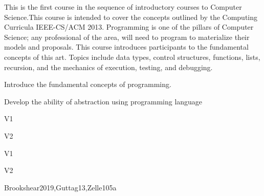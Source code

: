 \begin{syllabus}


\begin{justification}
This is the first course in the sequence of introductory courses to Computer Science.This course is intended to cover the concepts outlined by the
Computing Curricula IEEE-CS/ACM 2013.
Programming is one of the pillars of Computer Science; any professional of the area, will need to program to materialize their models and proposals.
This course introduces participants to the fundamental concepts of this art.
Topics include data types, control structures, functions, lists, recursion, and the mechanics of execution, testing, and debugging.
\end{justification}

\begin{goals}
\item Introduce the fundamental concepts of programming.
\item Develop the ability of abstraction using programming language
\end{goals}

\begin{outcomes}{V1}
    \item {}
    \item {}
\end{outcomes}

\begin{outcomes}{V2}
    \item {}
    \item {}
\end{outcomes}

\begin{competences}{V1}
    \item {} 
    \item {} 
\end{competences}

\begin{competences}{V2}
    \item {} 
    \item {} 
\end{competences}

\begin{unit}{\SPHistory}{}{Brookshear2019,Guttag13,Zelle10}{5}{a}
    \begin{topics}
        \item \SPHistoryTopicPrehistory
        \item \SPHistoryTopicHistory
        \item \SPHistoryTopicPioneers
        \item \SPHistoryTopicHistoryOf
    \end{topics}
    

\end{unit}
\end{syllabus}
